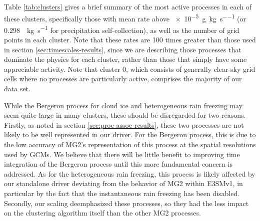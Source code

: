 \documentclass [11pt, proquest] {uwthesis}[2020/02/24]
\begin{document}
Table \ref{tab:clusters} gives a brief summary of the most active processes in each of these clusters, specifically those with mean rate above \SI{e-5}{\gram\per\kilo\gram\per\second} (or \SI{0.298}{\per\kilo\gram\per\second} for precipitation self-collection), as well as the number of grid points in each cluster. Note that these rates are \num{100} times greater than those used in section \ref{sec:timescales-results}, since we are describing those processes that dominate the physics for each cluster, rather than those that simply have some appreciable activity. Note that cluster 0, which consists of generally clear-sky grid cells where no processes are particularly active, comprises the majority of our data set.

While the Bergeron process for cloud ice and heterogeneous rain freezing may seem quite large in many clusters, these should be disregarded for two reasons. Firstly, as noted in section \ref{sec:proc-assoc-results}, these two processes are not likely to be well represented in our driver. For the Bergeron process, this is due to the low accuracy of MG2's representation of this process at the spatial resolutions used by GCMs. We believe that there will be little benefit to improving time integration of the Bergeron process until this more fundamental concern is addressed. As for the heterogeneous rain freezing, this process is likely affected by our standalone driver deviating from the behavior of MG2 within E3SMv1, in particular by the fact that the instantaneous rain freezing has been disabled. Secondly, our scaling deemphasized these processes, so they had the less impact on the clustering algorithm itself than the other MG2 processes.
\end{document}
